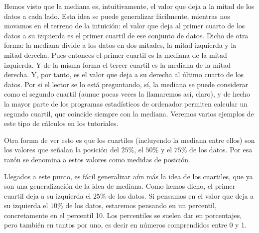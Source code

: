 Hemos visto que la mediana es, intuitivamente, el valor que deja a la mitad de
los datos a cada lado. Esta idea se puede generalizar fácilmente, mientras nos
movamos en el terreno de la intuición: el valor que deja al primer cuarto de
los datos a su izquierda es el {\sf primer cuartil} de ese
conjunto de datos. Dicho de otra forma: la mediana divide a los datos en dos
mitades, la mitad izquierda y la mitad derecha. Pues entonces el primer cuartil
es la mediana de la mitad izquierda. Y de la misma forma el {\sf tercer
cuartil} es la mediana de la mitad derecha. Y, por tanto, es el valor que deja
a su derecha al último cuarto de los datos. Por si el lector se lo está
preguntando, sí, la mediana se puede considerar como el segundo cuartil (aunue
pocas veces la llamaremos así, claro), y de hecho la mayor parte de los
programas estadísticos de ordenador permiten calcular un segundo cuartil, que
coincide siempre con la mediana. Veremos varios ejemplos de este tipo
de cálculos en los tutoriales.

Otra forma de ver esto es que los cuartiles (incluyendo la mediana entre ellos)
son los valores que señalan la posición del $25\%$, el $50\%$ y el $75\%$ de
los datos. Por esa razón se denomina a estos valores como {\sf medidas de
posición}.

Llegados a este punto, es fácil generalizar aún más la idea de los cuartiles,
que ya son una generalización de la idea de mediana. Como hemos dicho, el
primer cuartil deja a su izquierda el $25\%$ de los datos. Si pensamos en el
valor que deja a su izquierda el $10\%$ de los datos, estaremos pensando en un
 {\sf percentil,} concretamente en el percentil 10.  Los
percentiles se suelen dar en porcentajes, pero también en tantos por uno, es
decir en números comprendidos entre 0 y 1.

